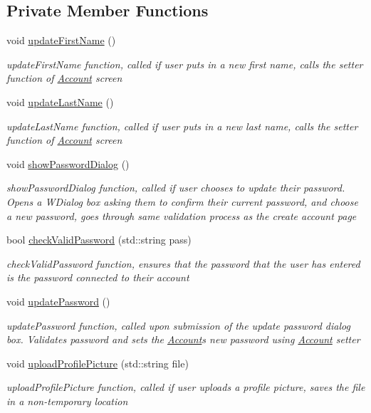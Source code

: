 \subsection*{Private Member Functions}
\begin{DoxyCompactItemize}
\item 
void \hyperlink{classProfileWidget_a07bcf16818fe49254c5aa80eefdc68b8}{update\+First\+Name} ()
\begin{DoxyCompactList}\small\item\em update\+First\+Name function, called if user puts in a new first name, calls the setter function of \hyperlink{classAccount}{Account} screen \end{DoxyCompactList}\item 
void \hyperlink{classProfileWidget_a990300c69c3177fea08ae6af21d33945}{update\+Last\+Name} ()
\begin{DoxyCompactList}\small\item\em update\+Last\+Name function, called if user puts in a new last name, calls the setter function of \hyperlink{classAccount}{Account} screen \end{DoxyCompactList}\item 
void \hyperlink{classProfileWidget_a9dff9212fcc936cc5a77db50b3675adb}{show\+Password\+Dialog} ()
\begin{DoxyCompactList}\small\item\em show\+Password\+Dialog function, called if user chooses to update their password. Opens a W\+Dialog box asking them to confirm their current password, and choose a new password, goes through same validation process as the create account page \end{DoxyCompactList}\item 
bool \hyperlink{classProfileWidget_a68729c760462780f9b1bf5e9dac739db}{check\+Valid\+Password} (std\+::string pass)
\begin{DoxyCompactList}\small\item\em check\+Valid\+Password function, ensures that the password that the user has entered is the password connected to their account \end{DoxyCompactList}\item 
void \hyperlink{classProfileWidget_a0b822b0db6c6e3194d61b5cd427dff64}{update\+Password} ()
\begin{DoxyCompactList}\small\item\em update\+Password function, called upon submission of the update password dialog box. Validates password and sets the \hyperlink{classAccount}{Account}\textquotesingle{}s new password using \hyperlink{classAccount}{Account} setter \end{DoxyCompactList}\item 
void \hyperlink{classProfileWidget_a1e6942fd023d790cc5c2bcb26fa5a745}{upload\+Profile\+Picture} (std\+::string file)
\begin{DoxyCompactList}\small\item\em upload\+Profile\+Picture function, called if user uploads a profile picture, saves the file in a non-\/temporary location \end{DoxyCompactList}\end{DoxyCompactItemize}
